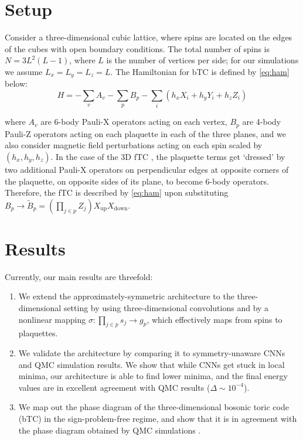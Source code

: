 \documentclass[
  aps,            %
  prl,            %
  reprint,        %
  groupedaddress, %
  amsmath,amssymb,
  floatfix,       %
  nofootinbib,    %
  longbibliography %
]{revtex4-2}
\newcommand{\todo}[1]{\textcolor{red}{\textbf{[TODO: #1]}}}
\newcommand{\sechead}[1]{\textit{#1}---}
\begin{document}
\section{Setup}
Consider a three-dimensional cubic lattice, where spins are located on the edges of the cubes with open boundary conditions. The total number of spins is $N = 3L^2(L-1)$, where $L$ is the number of vertices per side; for our simulations we assume $L_x=L_y = L_z=L$. The Hamiltonian for bTC \cite{kitaev2003,hamma2005} is defined by \cref{eq:ham} below:
\begin{equation}\label{eq:ham}
    H = - \sum_v A_v  - \sum_p B_p - \sum_i \left( h_x X_i + h_y Y_i + h_z Z_i \right)
\end{equation}

where $A_v$ are 6-body Pauli-X operators acting on each vertex, $B_p$ are 4-body Pauli-Z operators acting on each plaquette in each of the three planes, and we also consider magnetic field perturbations acting on each spin scaled by $(h_x, h_y, h_z)$. In the case of the 3D fTC \cite{levinwen2003}, the plaquette terms get `dressed' by two additional Pauli-X operators on perpendicular edges at opposite corners of the plaquette, on opposite sides of its plane, to become 6-body operators. Therefore, the fTC is described by \cref{eq:ham} upon substituting $B_p \rightarrow \tilde{B}_p = \left(\prod_{j\in p} Z_j\right) X_{\text{up}}X_{\text{down}}$.

\section{Results}

Currently, our main results are threefold:
\begin{enumerate}
    \item We extend the approximately-symmetric architecture to the three-dimensional setting by using three-dimensional convolutions and by a nonlinear mapping $\sigma : \prod_{j \in p} s_j \rightarrow g_p$, which effectively maps from spins to plaquettes.
    \item We validate the architecture by comparing it to symmetry-unaware CNNs and QMC simulation results. We show that while CNNs get stuck in local minima, our architecture is able to find lower minima, and the final energy values are in excellent agreement with QMC results ($\Delta \sim 10^{-4}$).
    \item We map out the phase diagram of the three-dimensional bosonic toric code (bTC) in the sign-problem-free regime, and show that it is in agreement with the phase diagram obtained by QMC simulations \cite{linsel2026}.
\end{enumerate}
\end{document}
